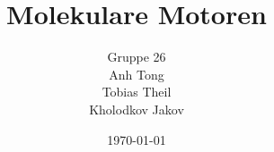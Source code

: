 \documentclass[
    a4paper,
    ngerman,
    11pt
]{scrartcl}
\title{Molekulare Motoren}
\author{Gruppe 26\\ Anh Tong \\ Tobias Theil \\ Kholodkov Jakov }
\date{\today}
\begin{document}
	
\maketitle
\tableofcontents



\newpage






 


\begin{appendix}

\end{appendix}
 
\end{document}
